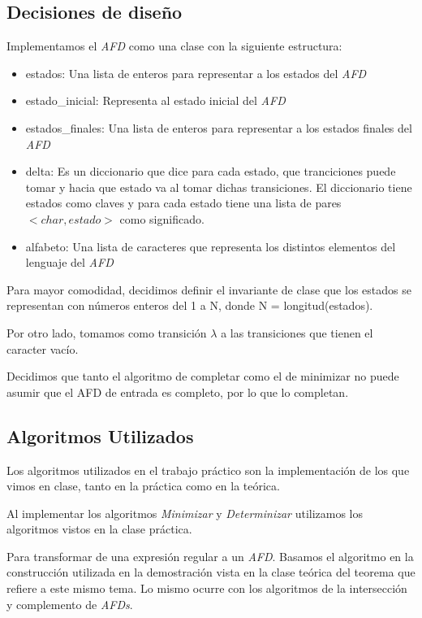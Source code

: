 \subsection{Decisiones de diseño}
Implementamos el \emph{AFD} como una clase con la siguiente estructura:

\begin{itemize}
	\item estados: Una lista de enteros para representar a los estados del \emph{AFD}
	\item estado\_inicial: Representa al estado inicial del \emph{AFD}
	\item estados\_finales: Una lista de enteros para representar a los estados finales del \emph{AFD}
	\item delta: Es un diccionario que dice para cada estado, que tranciciones puede tomar y hacia que estado va al tomar dichas transiciones. El diccionario tiene estados como claves y para cada estado tiene una lista de pares $<char, estado>$ como significado.
	\item alfabeto: Una lista de caracteres que representa los distintos elementos del lenguaje del \emph{AFD}
\end{itemize}

Para mayor comodidad, decidimos definir el invariante de clase que los estados se representan con números enteros del 1 a N, donde N = longitud(estados).

Por otro lado, tomamos como transición $\lambda$ a las transiciones que tienen el caracter vacío.

Decidimos que tanto el algoritmo de completar como el de minimizar no puede asumir que el AFD de entrada es completo, por lo que lo completan.

\subsection{Algoritmos Utilizados}

Los algoritmos utilizados en el trabajo práctico son la implementación de los que vimos en clase, tanto en la práctica como en la teórica.

Al implementar los algoritmos \emph{Minimizar} y \emph{Determinizar} utilizamos los algoritmos vistos en la clase práctica.

Para transformar de una expresión regular a un \emph{AFD}. Basamos el algoritmo en la construcción utilizada en la demostración vista en la clase teórica del teorema que refiere a este mismo tema. Lo mismo ocurre con los algoritmos de la intersección y complemento de \emph{AFDs}.

